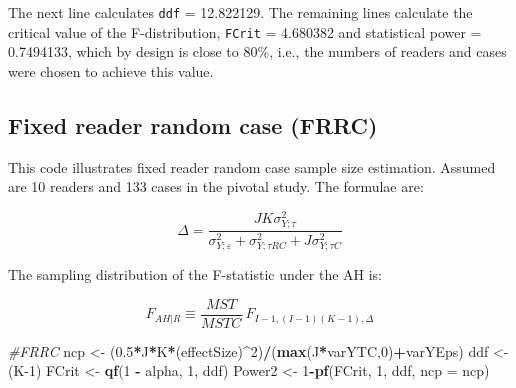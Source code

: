 \documentclass[]{book}
\newenvironment{Shaded}{\begin{snugshade}}{\end{snugshade}}
\newcommand{\CommentTok}[1]{\textcolor[rgb]{0.56,0.35,0.01}{\textit{#1}}}
\newcommand{\DataTypeTok}[1]{\textcolor[rgb]{0.13,0.29,0.53}{#1}}
\newcommand{\DecValTok}[1]{\textcolor[rgb]{0.00,0.00,0.81}{#1}}
\newcommand{\FloatTok}[1]{\textcolor[rgb]{0.00,0.00,0.81}{#1}}
\newcommand{\KeywordTok}[1]{\textcolor[rgb]{0.13,0.29,0.53}{\textbf{#1}}}
\newcommand{\NormalTok}[1]{#1}
\newcommand{\OperatorTok}[1]{\textcolor[rgb]{0.81,0.36,0.00}{\textbf{#1}}}
\newcommand{\StringTok}[1]{\textcolor[rgb]{0.31,0.60,0.02}{#1}}
\begin{document}
\begin{Shaded}
\end{Shaded}

The next line calculates \texttt{ddf} = 12.822129. The remaining lines calculate the critical value of the F-distribution, \texttt{FCrit} = 4.680382 and statistical power = 0.7494133, which by design is close to 80\%, i.e., the numbers of readers and cases were chosen to achieve this value.

\hypertarget{fixed-reader-random-case-frrc}{%
\subsection{Fixed reader random case (FRRC)}\label{fixed-reader-random-case-frrc}}

This code illustrates fixed reader random case sample size estimation. Assumed are 10 readers and 133 cases in the pivotal study. The formulae are:

\[\Delta =\frac{JK\sigma _{Y;\tau }^{2}}{\sigma _{Y;\varepsilon }^{2}+\sigma _{Y;\tau RC}^{2}+J\sigma _{Y;\tau C}^{2}}\]

The sampling distribution of the F-statistic under the AH is:

\[{{F}_{\left. AH \right|R}}\equiv \frac{MST}{MSTC}\tilde{\ }{{F}_{I-1,\left( I-1 \right)\left( K-1 \right),\Delta }}\]

\begin{Shaded}
\begin{Highlighting}[]
\CommentTok{#FRRC}
\NormalTok{ncp <-}\StringTok{ }\NormalTok{(}\FloatTok{0.5}\OperatorTok{*}\NormalTok{J}\OperatorTok{*}\NormalTok{K}\OperatorTok{*}\NormalTok{(effectSize)}\OperatorTok{^}\DecValTok{2}\NormalTok{)}\OperatorTok{/}\NormalTok{(}\KeywordTok{max}\NormalTok{(J}\OperatorTok{*}\NormalTok{varYTC,}\DecValTok{0}\NormalTok{)}\OperatorTok{+}\NormalTok{varYEps)}
\NormalTok{ddf <-}\StringTok{ }\NormalTok{(K}\DecValTok{-1}\NormalTok{)}
\NormalTok{FCrit <-}\StringTok{ }\KeywordTok{qf}\NormalTok{(}\DecValTok{1} \OperatorTok{-}\StringTok{ }\NormalTok{alpha, }\DecValTok{1}\NormalTok{, ddf)}
\NormalTok{Power2 <-}\StringTok{ }\DecValTok{1}\OperatorTok{-}\KeywordTok{pf}\NormalTok{(FCrit, }\DecValTok{1}\NormalTok{, ddf, }\DataTypeTok{ncp =}\NormalTok{ ncp)}
\end{Highlighting}
\end{Shaded}
\end{document}
